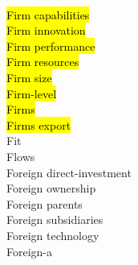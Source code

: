 \documentclass[a4paper]{article}
\begin{document}
\begin{multicols*}{2}
\begin{footnotesize}
\\ \hl{Firm capabilities} \\ \hl{Firm innovation} \\ \hl{Firm performance} \\ \hl{Firm resources} \\ \hl{Firm size} \\ \hl{Firm-level} \\ \hl{Firms} \\ \hl{Firms export} \\ Fit \\ Flows \\ Foreign direct-investment \\ Foreign ownership \\ Foreign parents \\ Foreign subsidiaries \\ Foreign technology \\ Foreign-a
\end{footnotesize}
\end{multicols*}
\end{document}
